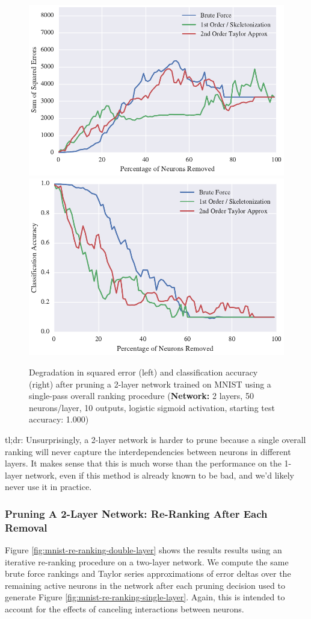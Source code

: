 \begin{figure}
\centering
\includegraphics[width=0.49\linewidth]{png/mnist-deep-single-pass-method.pdf}
\includegraphics[width=0.49\linewidth]{png/mnist-deep-single-pass-accuracy.pdf}
\caption{Degradation in squared error (left) and classification accuracy (right) after pruning a 2-layer network trained on MNIST using a single-pass overall ranking procedure (\textbf{Network:} 2 layers, 50 neurons/layer, 10 outputs, logistic sigmoid activation, starting test accuracy: 1.000)}
\label{fig:mnist-single-ranking-double-layer}
\end{figure}

tl;dr: Unsurprisingly, a 2-layer network is harder to prune because a single overall ranking will never capture the interdependencies between neurons in different layers. It makes sense that this is much worse than the performance on the 1-layer network, even if this method is already known to be bad, and we'd likely never use it in practice. 


\subsubsection{Pruning A 2-Layer Network: Re-Ranking After Each Removal}
Figure \ref{fig:mnist-re-ranking-double-layer} shows the results results using an iterative re-ranking procedure on a two-layer network. We compute the same brute force rankings and Taylor series approximations of error deltas over the remaining active neurons in the network after each pruning decision used to generate Figure \ref{fig:mnist-re-ranking-single-layer}. Again, this is intended to account for the effects of canceling interactions between neurons. 

